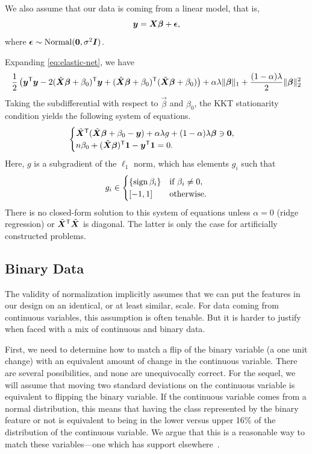We also assume that our data is coming from a linear model, that is,
\[
  \vec y = \mat X\vec\beta + \vec\epsilon,
\]
where \(\vec\epsilon \sim \normal(\vec 0, \sigma^2\mat I)\).

Expanding \eqref{eq:elastic-net}, we have
\[
  \begin{aligned}
    \frac{1}{2}\left( \vec y^\T \vec y - 2(\tilde{\mat{X}}\vec{\beta} + \beta_0)^\T\vec{y} + (\tilde{\mat{X}}\vec{\beta} + \beta_0)^\T(\tilde{\mat{X}}\vec{\beta} + \beta_0)\right) + \alpha\lambda \lVert \vec\beta \rVert_1 + \frac{(1 - \alpha)\lambda}{2}\lVert \vec \beta \rVert_2^2 \\
  \end{aligned}
\]
Taking the subdifferential with respect to \(\vec{\beta}\) and \(\beta_0\), the KKT stationarity condition yields the following system of equations.
\[
  \begin{cases}
    \tilde{\mat{X}}^\T(\tilde{\mat{X}}\vec{\beta} + \beta_0 - \vec{y}) + \alpha\lambda g + (1 - \alpha)\lambda \vec\beta \ni \vec{0}, \\
    n \beta_0 + (\tilde{\mat{X}}\vec{\beta})^\T \vec{1} - \vec{y}^\T \vec{1} = 0.
  \end{cases}
\]
Here, \(g\) is a subgradient of the \(\ell_1\) norm, which has elements \(g_i\) such that
\[
  g_i \in
  \begin{cases}
    \{\operatorname{sign}{\beta_i}\} & \text{if } \beta_i \neq 0, \\
    [-1, 1]            & \text{otherwise}.
  \end{cases}
\]
There is no closed-form solution to this system of equations unless \(\alpha = 0\) (ridge regression) or \(\tilde{\mat{X}}^\T\tilde{\mat{X}}\) is diagonal. The latter is only the case for artificially constructed problems.

\subsection{Binary Data}

The validity of normalization implicitly assumes that we can put the features in our design on an identical, or at least similar, scale. For data coming from continuous variables, this assumption is often tenable. But it is harder to justify when faced with a mix of continuous and binary data.

First, we need to determine how to match a flip of the binary variable (a one unit change) with an equivalent amount of change in the continuous variable. There are several possibilities, and none are unequivocally correct. For the sequel, we will assume that moving two standard deviations on the continuous variable is equivalent to flipping the binary variable. If the continuous variable comes from a normal distribution, this means that having the class represented by the binary feature or not is equivalent to being in the lower versus upper 16\% of the distribution of the continuous variable. We argue that this is a reasonable way to match these variables---one which has support elsewhere~\parencite{gelman2008}.

